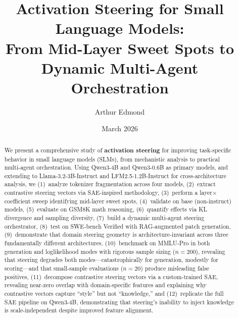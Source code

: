 \documentclass[11pt,a4paper]{article}
\title{Activation Steering for Small Language Models:\\
From Mid-Layer Sweet Spots to Dynamic Multi-Agent Orchestration}
\author[1]{Arthur Edmond}
\affil[1]{LLM Engineer, Swapn}
\date{March 2026}
\begin{document}
\maketitle

\begin{abstract}
We present a comprehensive study of \textbf{activation steering} for improving task-specific behavior in small language models (SLMs), from mechanistic analysis to practical multi-agent orchestration. Using Qwen3-4B and Qwen3-0.6B as primary models, and extending to Llama-3.2-3B-Instruct and LFM2.5-1.2B-Instruct for cross-architecture analysis, we (1)~analyze tokenizer fragmentation across four models, (2)~extract contrastive steering vectors via SAE-inspired methodology, (3)~perform a layer$\times$coefficient sweep identifying mid-layer sweet spots, (4)~validate on base (non-instruct) models, (5)~evaluate on GSM8K math reasoning, (6)~quantify effects via KL divergence and sampling diversity, (7)~build a dynamic multi-agent steering orchestrator, (8)~test on SWE-bench Verified with RAG-augmented patch generation, (9)~demonstrate that domain steering geometry is architecture-invariant across three fundamentally different architectures, (10)~benchmark on MMLU-Pro in both generation and loglikelihood modes with rigorous sample sizing ($n=200$), revealing that steering degrades both modes---catastrophically for generation, modestly for scoring---and that small-sample evaluations ($n=20$) produce misleading false positives, (11)~decompose contrastive steering vectors via a custom-trained SAE, revealing near-zero overlap with domain-specific features and explaining why contrastive vectors capture ``style'' but not ``knowledge,'' and (12)~replicate the full SAE pipeline on Qwen3-4B, demonstrating that steering's inability to inject knowledge is scale-independent despite improved feature alignment.


\end{abstract}
\end{document}
